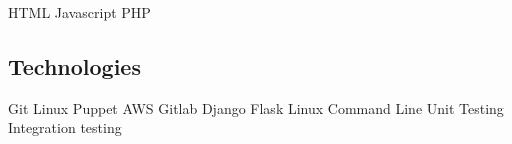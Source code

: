 \documentclass[letterpaper]{deedy-resume} %
\newcommand{\bul}{\textbullet{}}
\begin{document}
\begin{minipage}[t]{0.33\textwidth}
HTML \bul Javascript \bul PHP

\sectionspace %

\subsection{Technologies}

Git \bul Linux \bul Puppet \bul AWS \bul Gitlab \bul Django \bul Flask
\bul Linux Command Line \bul Unit Testing \bul Integration testing


\end{minipage} %
\hfill
%
%
\end{document}
